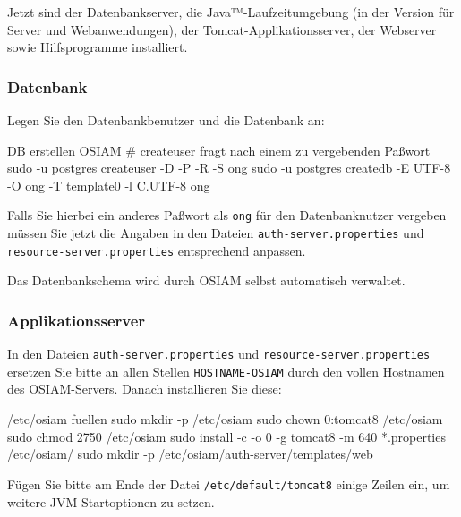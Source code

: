 \documentclass{tarentanleitung}
\begin{document}
Jetzt sind der Datenbankserver, die Java™-Laufzeitumgebung (in der
Version für Server und Webanwendungen), der Tomcat-Applikationsserver,
der Webserver sowie Hilfsprogramme installiert.

\subsubsection{Datenbank}\label{subsubsec:setup-osiam-db}

\begin{minipage}{\linewidth}
Legen Sie den Datenbankbenutzer und die Datenbank an:

\begin{lstdump}{DB erstellen OSIAM}
# createuser fragt nach einem zu vergebenden Paßwort
sudo -u postgres createuser -D -P -R -S ong
sudo -u postgres createdb -E UTF-8 -O ong -T template0 -l C.UTF-8 ong
\end{lstdump}

Falls Sie hierbei ein anderes Paßwort als \texttt{ong} für
den Datenbanknutzer vergeben müssen Sie jetzt die Angaben
in den Dateien \texttt{auth-server.properties} und
\texttt{resource-server.properties} entsprechend anpassen.
\end{minipage}

Das Datenbankschema wird durch OSIAM selbst automatisch verwaltet.

\subsubsection{Applikationsserver}\label{subsubsec:setup-osiam-tomcat}

\begin{minipage}{\linewidth}
In den Dateien \texttt{auth-server.properties} und
\texttt{resource-server.properties} ersetzen Sie bitte an allen
Stellen \texttt{HOSTNAME-OSIAM} durch den vollen Hostnamen des
OSIAM-Servers. Danach installieren Sie diese:

\begin{lstdump}{/etc/osiam fuellen}
sudo mkdir -p /etc/osiam
sudo chown 0:tomcat8 /etc/osiam
sudo chmod 2750 /etc/osiam
sudo install -c -o 0 -g tomcat8 -m 640 *.properties /etc/osiam/
sudo mkdir -p /etc/osiam/auth-server/templates/web
\end{lstdump}
\end{minipage}

Fügen Sie bitte am Ende der Datei \texttt{/etc/default/tomcat8}
einige Zeilen ein, um weitere JVM-Startoptionen zu setzen.
\end{document}
